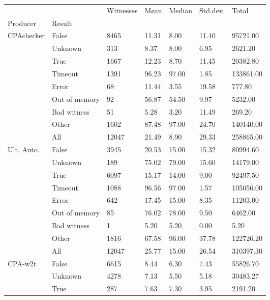 \documentclass[notitlepage]{article}
\begin{document}
\begin{tabular}{lllllll}
\toprule
       &     & Witnesses &  Mean & Median & Std.dev. &     Total \\
Producer & Result &           &       &        &          &           \\
\midrule
CPAchecker & False &      8465 & 11.31 &   8.00 &    11.40 &  95721.00 \\
       & Unknown &       313 &  8.37 &   8.00 &     6.95 &   2621.20 \\
       & True &      1667 & 12.23 &   8.70 &    11.45 &  20382.80 \\
       & Timeout &      1391 & 96.23 &  97.00 &     1.85 & 133861.00 \\
       & Error &        68 & 11.44 &   3.55 &    19.58 &    777.80 \\
       & Out of memory &        92 & 56.87 &  54.50 &     9.97 &   5232.00 \\
       & Bad witness &        51 &  5.28 &   3.20 &    11.49 &    269.20 \\
       & Other &      1602 & 87.48 &  97.00 &    24.70 & 140140.00 \\
       & All &     12047 & 21.49 &   8.90 &    29.33 & 258865.00 \\
Ult. Auto. & False &      3945 & 20.53 &  15.00 &    15.32 &  80994.60 \\
       & Unknown &       189 & 75.02 &  79.00 &    15.60 &  14179.00 \\
       & True &      6097 & 15.17 &  14.00 &     9.00 &  92497.50 \\
       & Timeout &      1088 & 96.56 &  97.00 &     1.57 & 105056.00 \\
       & Error &       642 & 17.45 &  15.00 &     8.35 &  11203.00 \\
       & Out of memory &        85 & 76.02 &  78.00 &     9.50 &   6462.00 \\
       & Bad witness &         1 &  5.20 &   5.20 &     0.00 &      5.20 \\
       & Other &      1816 & 67.58 &  96.00 &    37.78 & 122726.20 \\
       & All &     12047 & 25.77 &  15.00 &    26.54 & 310397.30 \\
CPA-w2t & False &      6615 &  8.44 &   6.30 &     7.43 &  55826.70 \\
       & Unknown &      4278 &  7.13 &   5.50 &     5.18 &  30483.27 \\
       & True &       287 &  7.63 &   7.30 &     3.95 &   2191.20 \\

\end{tabular}
\end{document}
